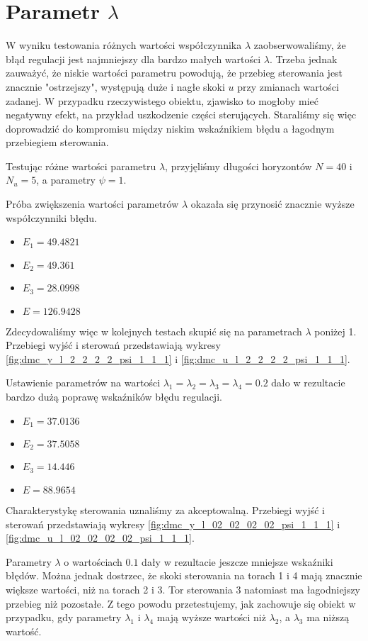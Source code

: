 \section{Parametr $\lambda$}
W wyniku testowania różnych wartości współczynnika $\lambda$ zaobserwowaliśmy, że błąd regulacji jest najmniejszy dla bardzo małych wartości $\lambda$. Trzeba jednak zauważyć, że niskie wartości parametru powodują, że przebieg sterowania jest znacznie "ostrzejszy", występują duże i nagłe skoki $u$ przy zmianach wartości zadanej. W przypadku rzeczywistego obiektu, zjawisko to mogłoby mieć negatywny efekt, na przykład uszkodzenie części sterujących. Staraliśmy się więc doprowadzić do kompromisu między niskim wskaźnikiem błędu a łagodnym przebiegiem sterowania.

Testując różne wartości parametru $\lambda$, przyjęliśmy długości horyzontów $N=40$ i $N_u=5$, a parametry $\psi = 1$.

Próba zwiększenia wartości parametrów $\lambda$ okazała się przynosić znacznie wyższe współczynniki błędu.
\begin{itemize}
\item $E_1=\num{49,4821}$
\item $E_2=\num{49,361}$
\item $E_3=\num{28,0998}$
\item $E=\num{126,9428}$
\end{itemize}
Zdecydowaliśmy więc w kolejnych testach skupić się na parametrach $\lambda$ poniżej 1. Przebiegi wyjść i sterowań przedstawiają wykresy \ref{fig:dmc_y_l_2_2_2_2_psi_1_1_1} i \ref{fig:dmc_u_l_2_2_2_2_psi_1_1_1}.

Ustawienie parametrów na wartości $\lambda_1=\lambda_2=\lambda_3=\lambda_4=\num{0,2}$ dało w rezultacie bardzo dużą poprawę wskaźników błędu regulacji.
\begin{itemize}
\item $E_1=\num{37,0136}$
\item $E_2=\num{37,5058}$
\item $E_3=\num{14,446}$
\item $E=\num{88,9654}$
\end{itemize}
Charakterystykę sterowania uznaliśmy za akceptowalną. Przebiegi wyjść i sterowań przedstawiają wykresy \ref{fig:dmc_y_l_02_02_02_02_psi_1_1_1} i \ref{fig:dmc_u_l_02_02_02_02_psi_1_1_1}.

Parametry $\lambda$ o wartościach $\num{0,1}$ dały w rezultacie jeszcze mniejsze wskaźniki błędów. Można jednak dostrzec, że skoki sterowania na torach 1 i 4 mają znacznie większe wartości, niż na torach 2 i 3. Tor sterowania 3 natomiast ma łagodniejszy przebieg niż pozostałe. Z tego powodu przetestujemy, jak zachowuje się obiekt w przypadku, gdy parametry $\lambda_1$ i $\lambda_4$ mają wyższe wartości niż $\lambda_2$, a $\lambda_3$ ma niższą wartość. 

